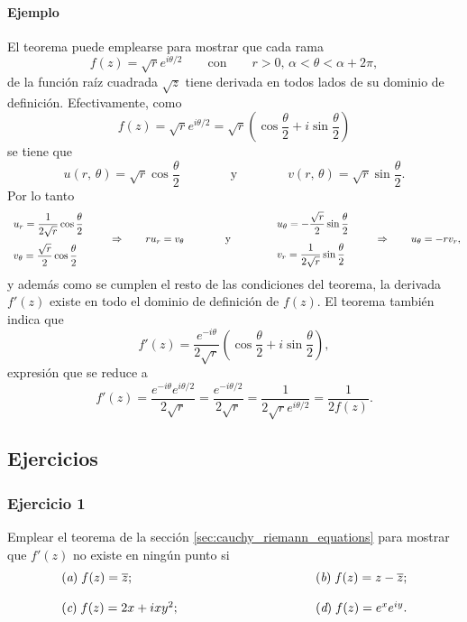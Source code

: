 \documentclass[a4paper]{report}
\begin{document}
\paragraph{Ejemplo} El teorema puede emplearse para mostrar que cada rama
\[
 f(z)=\sqrt{r}e^{i\theta/2}\qquad\textrm{con}\qquad r>0,\,\alpha<\theta<\alpha+2\pi,
\]
de la función raíz cuadrada \(\sqrt{z}\) tiene derivada en todos lados de su dominio de definición. Efectivamente, como
\[
 f(z)=\sqrt{r}e^{i\theta/2}=\sqrt{r}\left(\cos\frac{\theta}{2}+i\sin\frac{\theta}{2}\right)
\]
se tiene que 
\[
 u(r,\,\theta)=\sqrt{r}\cos\frac{\theta}{2}
  \qquad\qquad\textrm{y}\qquad\qquad
 v(r,\,\theta)=\sqrt{r}\sin\frac{\theta}{2}.
\]
Por lo tanto
\[
 \begin{array}{l}
  u_r=\dfrac{1}{2\sqrt{r}}\cos\dfrac{\theta}{2}\\[\bigskipamount]
  v_\theta=\dfrac{\sqrt{r}}{2}\cos\dfrac{\theta}{2}
 \end{array}
 \qquad\Rightarrow\qquad
 ru_r=v_\theta
 \qquad\qquad\textrm{y}\qquad\qquad
 \begin{array}{l}
  u_\theta=-\dfrac{\sqrt{r}}{2}\sin\dfrac{\theta}{2}\\[\bigskipamount]
  v_r=\dfrac{1}{2\sqrt{r}}\sin\dfrac{\theta}{2}
 \end{array}
 \qquad\Rightarrow\qquad
 u_\theta=-rv_r,
\]
y además como se cumplen el resto de las condiciones del teorema, la derivada \(f'(z)\) existe en todo el dominio de definición de \(f(z)\). El teorema también indica que 
\[
 f'(z)=\frac{e^{-i\theta}}{2\sqrt{r}}\left(\cos\frac{\theta}{2}+i\sin\frac{\theta}{2}\right),
\]
expresión que se reduce a 
\[
 f'(z)=\frac{e^{-i\theta}e^{i\theta/2}}{2\sqrt{r}}
  =\frac{e^{-i\theta/2}}{2\sqrt{r}}
  =\frac{1}{2\sqrt{r}e^{i\theta/2}}
  =\frac{1}{2f(z)}.
\]

\subsection{Ejercicios}\label{sec:differentiation_excercises}

\subsubsection{Ejercicio 1}

Emplear el teorema de la sección \ref{sec:cauchy_riemann_equations} para mostrar que \(f'(z)\) no existe en ningún punto si
\[
 \begin{array}{ll}
  (\textit{a})\;f(z)=\overline{z};\qquad\qquad\qquad\qquad\qquad&(\textit{b})\;f(z)=z-\overline{z};\\[\bigskipamount]
  (\textit{c})\;f(z)=2x+ixy^2;\qquad\qquad\qquad\qquad\qquad&(\textit{d})\;f(z)=e^xe^{iy}.
 \end{array}
\]
\end{document}
